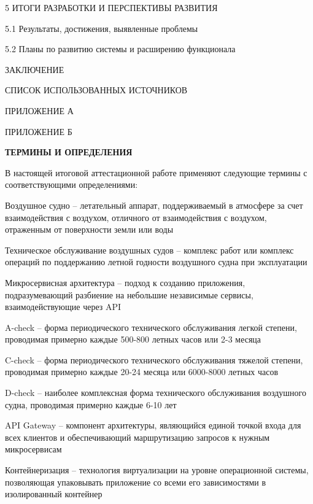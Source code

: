 \documentclass[14pt,a4paper]{extarticle}
\newcommand{\headersection}[1]{
  \begin{center}
    \textbf{\MakeUppercase{#1}}
  \end{center}
  \addcontentsline{toc}{section}{#1}
}
\begin{document}
\begin{flushleft}
5 ИТОГИ РАЗРАБОТКИ И ПЕРСПЕКТИВЫ РАЗВИТИЯ 

\hspace{0.63cm}5.1 Результаты, достижения, выявленные проблемы 

\hspace{0.63cm}5.2 Планы по развитию системы и расширению функционала 

ЗАКЛЮЧЕНИЕ 

СПИСОК ИСПОЛЬЗОВАННЫХ ИСТОЧНИКОВ 

ПРИЛОЖЕНИЕ А 

ПРИЛОЖЕНИЕ Б 
\end{flushleft}
\endgroup
\clearpage



\clearpage

\headersection{ТЕРМИНЫ И ОПРЕДЕЛЕНИЯ}

В настоящей итоговой аттестационной работе применяют следующие термины с соответствующими определениями:

Воздушное судно – летательный аппарат, поддерживаемый в атмосфере за счет взаимодействия с воздухом, отличного от взаимодействия с воздухом, отраженным от поверхности земли или воды

Техническое обслуживание воздушных судов – комплекс работ или комплекс операций по поддержанию летной годности воздушного судна при эксплуатации

Микросервисная архитектура – подход к созданию приложения, подразумевающий разбиение на небольшие независимые сервисы, взаимодействующие через API

A-check – форма периодического технического обслуживания легкой степени, проводимая примерно каждые 500-800 летных часов или 2-3 месяца

C-check – форма периодического технического обслуживания тяжелой степени, проводимая примерно каждые 20-24 месяца или 6000-8000 летных часов

D-check – наиболее комплексная форма технического обслуживания воздушного судна, проводимая примерно каждые 6-10 лет

API Gateway – компонент архитектуры, являющийся единой точкой входа для всех клиентов и обеспечивающий маршрутизацию запросов к нужным микросервисам

Контейнеризация – технология виртуализации на уровне операционной системы, позволяющая упаковывать приложение со всеми его зависимостями в изолированный контейнер
\end{document}
